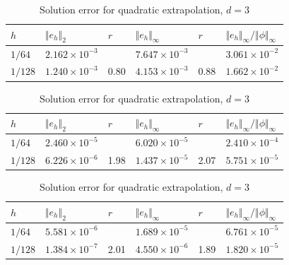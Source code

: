 \begin{table}[htb]
  \begin{center}
    \begin{tabular}{llllll}
      \hline
      $h$ & $\Vert e_h \Vert_2$ & $r$ & $\Vert e_h
      \Vert_\infty$ & $r$ & $\Vert e_h \Vert_\infty /
      \Vert \phi \Vert_\infty$ \\ [0.2ex] \hline 
      \vphantom{\rule{0pt}{2.7ex}}
      $1/64$  & $2.162 \times 10^{-3}$ & & $7.647 \times 10^{-3}$ & &
      $3.061 \times 10^{-2}$ \\ 
      $1/128$ & $1.240 \times 10^{-3}$ & 0.80 & $4.153 \times 10^{-3}$ &
      0.88 & $1.662 \times 10^{-2}$ \\ [0.2ex]
      \hline
    \end{tabular}
    \caption{Solution error for constant extrapolation, $d=3$}
    \label{tbl:rel_error_const}
  \end{center}

  \begin{center}
    \begin{tabular}{llllll}
      \hline
      $h$ & $\Vert e_h \Vert_2$ & $r$ & $\Vert e_h
      \Vert_\infty$ & $r$ & $\Vert e_h \Vert_\infty /
      \Vert \phi \Vert_\infty$\\ [0.2ex]
      \hline 
      \vphantom{\rule{0pt}{2.7ex}}
      $1/64$  & $2.460 \times 10^{-5}$ & & $6.020 \times 10^{-5}$ & &
      $2.410 \times 10^{-4}$ \\
      $1/128$ & $6.226 \times 10^{-6}$ & 1.98 & $1.437 \times 10^{-5}$ &
      2.07 & $5.751 \times 10^{-5}$ \\ [0.2ex]
      \hline
    \end{tabular}
    \caption{Solution error for linear extrapolation, $d=3$}
    \label{tbl:rel_error_lin}
  \end{center}

  \begin{center}
    \begin{tabular}{llllll}
      \hline
      $h$ & $\Vert e_h \Vert_2$ & $r$ & $\Vert e_h
      \Vert_\infty$ & $r$ & $\Vert e_h \Vert_\infty /
      \Vert \phi \Vert_\infty$\\ [0.2ex]
      \hline 
      \vphantom{\rule{0pt}{2.7ex}}
      $1/64$  & $5.581 \times 10^{-6}$ & & $1.689 \times 10^{-5}$ & &
      $6.761 \times 10^{-5}$ \\ 
      $1/128$ & $1.384 \times 10^{-7}$ & 2.01 & $4.550 \times 10^{-6}$ &
      1.89 & $1.820 \times 10^{-5}$ \\ [0.2ex]
      \hline
    \end{tabular}
    \caption{Solution error for quadratic extrapolation, $d=3$}
    \label{tbl:rel_error_quad}
  \end{center}
\end{table}

